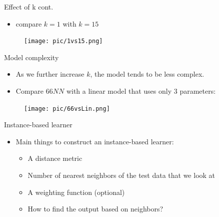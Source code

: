 \documentclass[serif, aspectratio=169]{beamer}
\begin{document}
\begin{frame}{Effect of k cont.}
    \begin{itemize}
        \item compare $k=1$ with $k=15$
    \end{itemize}
    \begin{figure}[h]
            \centering
            
            \texttt{[image: pic/1vs15.png]}
            \end{figure}
    
\end{frame}
\begin{frame}{Model complexity}
    \begin{itemize}
        \item As we further increase $k$, the model tends to be less complex.
        \item Compare $66NN$ with a linear model that uses only $3$ parameters:
    \end{itemize}
    
    \begin{figure}[h]
            \centering
            
            \texttt{[image: pic/66vsLin.png]}
            \end{figure}
            
    \vfill
\end{frame}

\begin{frame}{Instance-based learner}
    \begin{itemize}
        \item Main things to construct an instance-based learner:
        \begin{itemize}
            \item A distance metric
            \item Number of nearest neighbors of the test data that we look at
            \item A weighting function (optional)
            \item How to find the output based on neighbors?
        \end{itemize}
    \end{itemize}
\end{frame}
\end{document}
